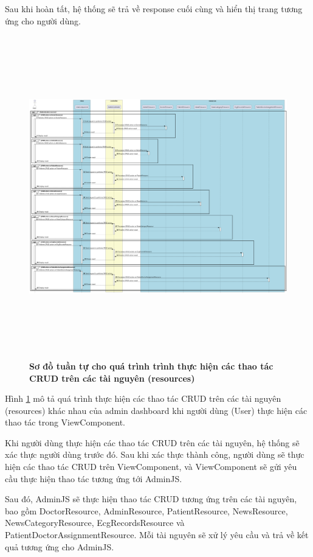 Sau khi hoàn tất, hệ thống sẽ trả về response cuối cùng và hiển thị trang tương ứng cho người dùng.


\begin{figure}[H]
  \centering
  \includegraphics[width=16cm,height=14cm]{Images/server/sequence/web/seq_crud.png}
  \caption[Sơ đồ tuần tự cho quá trình trình thực hiện các thao tác CRUD trên các tài nguyên (resources) ]{\bfseries \fontsize{12pt}{0pt}
  \selectfont Sơ đồ tuần tự cho quá trình trình thực hiện các thao tác CRUD trên các tài nguyên (resources) }
  \label{seq_crud} %
\end{figure}
Hình \ref{seq_crud}  mô tả quá trình thực hiện các thao tác CRUD trên các tài nguyên (resources) khác nhau của admin dashboard khi người dùng (User) thực hiện các thao tác trong ViewComponent.


Khi người dùng thực hiện các thao tác CRUD trên các tài nguyên, hệ thống sẽ xác thực người dùng trước đó. Sau khi xác thực thành công, người dùng sẽ thực hiện các thao tác CRUD trên ViewComponent, và ViewComponent sẽ gửi yêu cầu thực hiện thao tác tương ứng tới AdminJS.


Sau đó, AdminJS sẽ thực hiện thao tác CRUD tương ứng trên các tài nguyên, bao gồm DoctorResource, AdminResource, PatientResource, NewsResource, NewsCategoryResource, EcgRecordsResource và PatientDoctorAssignmentResource. Mỗi tài nguyên sẽ xử lý yêu cầu và trả về kết quả tương ứng cho AdminJS.


